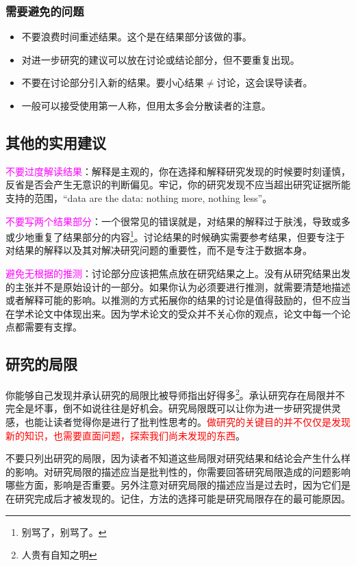 \documentclass[cn,hazy,blue,14pt,screen]{elegantnote} %
\begin{document}
\subsubsection{需要避免的问题}

\begin{itemize}
  \item 不要浪费时间重述结果。这个是在结果部分该做的事。
  \item 对进一步研究的建议可以放在讨论或结论部分，但不要重复出现。
  \item 不要在讨论部分引入新的结果。要小心结果$\neq$讨论，这会误导读者。
  \item 一般可以接受使用第一人称，但用太多会分散读者的注意。
\end{itemize}

\subsection{其他的实用建议}

\textcolor{magenta}{不要过度解读结果}：解释是主观的，你在选择和解释研究发现的时候要时刻谨慎，反省是否会产生无意识的判断偏见。牢记，你的研究发现不应当超出研究证据所能支持的范围，“data are the data: nothing more, nothing less”。

\textcolor{magenta}{不要写两个结果部分}：一个很常见的错误就是，对结果的解释过于肤浅，导致或多或少地重复了结果部分的内容\footnote{别骂了，别骂了。}。讨论结果的时候确实需要参考结果，但要专注于对结果的解释以及其对解决研究问题的重要性，而不是专注于数据本身。

\textcolor{magenta}{避免无根据的推测}：讨论部分应该把焦点放在研究结果之上。没有从研究结果出发的主张并不是原始设计的一部分。如果你认为必须要进行推测，就需要清楚地描述或者解释可能的影响。以推测的方式拓展你的结果的讨论是值得鼓励的，但不应当在学术论文中体现出来。因为学术论文的受众并不关心你的观点，论文中每一个论点都需要有支撑。

\subsection{研究的局限}

你能够自己发现并承认研究的局限比被导师指出好得多\footnote{人贵有自知之明}。承认研究存在局限并不完全是坏事，倒不如说往往是好机会。研究局限既可以让你为进一步研究提供灵感，也能让读者觉得你是进行了批判性思考的。\textcolor{red}{做研究的关键目的并不仅仅是发现新的知识，也需要直面问题，探索我们尚未发现的东西}。

不要只列出研究的局限，因为读者不知道这些局限对研究结果和结论会产生什么样的影响。对研究局限的描述应当是批判性的，你需要回答研究局限造成的问题影响哪些方面，影响是否重要。另外注意对研究局限的描述应当是过去时，因为它们是在研究完成后才被发现的。记住，方法的选择可能是研究局限存在的最可能原因。
\end{document}
